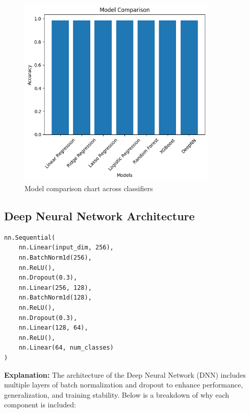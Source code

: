 \documentclass{article}
\begin{document}
\begin{figure}[H]
\centering
\includegraphics[width=0.85\textwidth]{model_comparison.png}
\caption{Model comparison chart across classifiers}
\end{figure}


\subsection{Deep Neural Network Architecture}
\begin{verbatim}
nn.Sequential(
    nn.Linear(input_dim, 256),
    nn.BatchNorm1d(256),
    nn.ReLU(),
    nn.Dropout(0.3),
    nn.Linear(256, 128),
    nn.BatchNorm1d(128),
    nn.ReLU(),
    nn.Dropout(0.3),
    nn.Linear(128, 64),
    nn.ReLU(),
    nn.Linear(64, num_classes)
)
\end{verbatim}

\textbf{Explanation:} The architecture of the Deep Neural Network (DNN) includes multiple layers of batch normalization and dropout to enhance performance, generalization, and training stability. Below is a breakdown of why each component is included:
\end{document}
